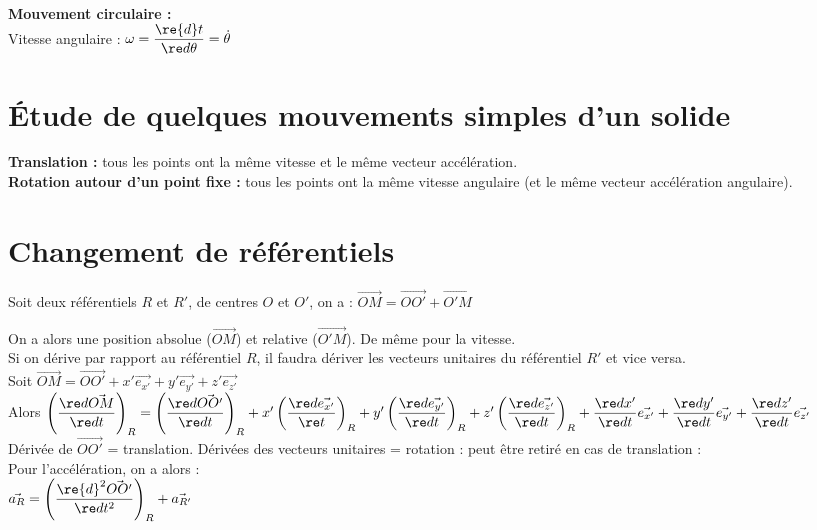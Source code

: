 \documentclass[13pt, twoside, a4paper, french]{report}
\begin{document}
    \\
    \textbf{Mouvement circulaire :}\\
    Vitesse angulaire : $\omega = \dfrac{\re{d}t}{\re d \theta} = \dot \theta$
    
  \section{Étude de quelques mouvements simples d’un solide}\label{sec:etude-de-quelques-mouvements-simples-dun-solide}
    
    \textbf{Translation :} tous les points ont la même vitesse et le même vecteur accélération.\\
    
    \textbf{Rotation autour d'un point fixe :} tous les points ont la même vitesse angulaire (et le même vecteur accélération angulaire).
    
  \section{Changement de référentiels}\label{sec:changement-de-referentiels}
    
    Soit deux référentiels $R$ et $R'$, de centres $O$ et $O'$, on a : $\vec{OM} = \vec{OO'} + \vec{O'M}$

    On a alors une position absolue ($\vec{OM}$) et relative ($\vec{O'M}$).
    De même pour la vitesse.\\
    
    Si on dérive par rapport au référentiel $R$, il faudra dériver les vecteurs unitaires du référentiel $R'$ et vice versa.\\
    
    Soit $\vec{OM} = \vec{OO'} + x' \vec{e_{x'}} + y' \vec{e_{y'}} + z' \vec{e_{z'}}$\\
    Alors $\left( \dfrac{\re d \vec{OM}}{\re d t} \right)_R =
\left( \dfrac{\re d \vec{OO'}}{\re d t} \right)_R + x' \left( \dfrac{\re d \vec{e_{x'}}}{\re t} \right)_R + y' \left( \dfrac{\re d \vec{e_{y'}}}{\re d t} \right)_R + z' \left( \dfrac{\re d \vec{e_{z'}}}{\re d t} \right)_R
  + \dfrac{\re d x'}{\re d t} \vec{e_{x'}} + \dfrac{\re d y'}{\re d t} \vec{e_{y'}} + \dfrac{\re d z'}{\re d t} \vec{e_{z'}}$\\
    
    Dérivée de $\vec{OO'}$ = translation.
    Dérivées des vecteurs unitaires = rotation : peut être retiré en cas de translation :\\
    Pour l'accélération, on a alors :\\
    
    $\vec{a_R} = \left( \dfrac{\re{d}^2 \vec{OO'}}{\re d t^2} \right)_R + \vec{a_{R'}}$
\end{document}
